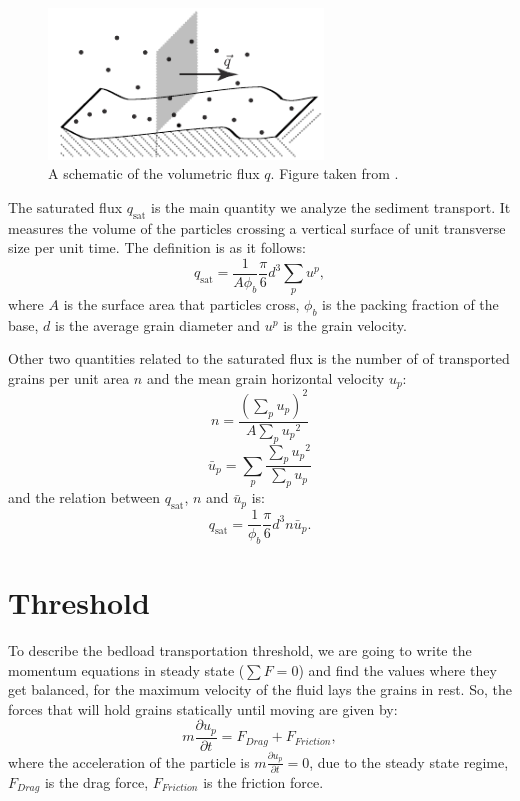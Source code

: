 \begin{figure}[H]
    \centering
    \includegraphics[width=0.65\textwidth]{04-figuras/flux_density.pdf}
    \caption[Transport volumetric flux.]{A schematic of the volumetric flux $q$. Figure taken from \cite{Granular_Media_Between_Fluid_and_Solid}.}
    \label{fig:flux_density}
\end{figure}

    The saturated flux $q_\textrm{sat}$ is the main quantity we analyze the sediment transport. It measures the volume of the particles crossing a vertical surface of unit transverse size per unit time. The definition is as it follows:
\begin{equation}
    q_\textrm{sat} = \frac{1}{A \phi_b} \frac{\pi}{6}d^3 \sum_p u^p,
    \label{equ:qsat}
\end{equation}
where $A$ is the surface area that particles cross, $\phi_b$ is the packing fraction of the base, $d$ is the average grain diameter and $u^p$ is the grain velocity.

    Other two quantities related to the saturated flux is the number of of transported grains per unit area $n$ and the mean grain horizontal velocity $u_p$:
\begin{equation}
    n = \frac{\left(\sum_p u_p\right)^2}{A\sum_p {u_p}^2}
    \label{equ:n}
\end{equation}
\begin{equation}
    \bar{u}_p = \sum_p \frac{\sum_p {u_p}^2}{\sum_p {u_p}}
    \label{equ:up}
\end{equation}
and the relation between $q_\textrm{sat}$, $n$ and $\bar{u}_p$ is:
\begin{equation}
    q_\textrm{sat} = \frac{1}{\phi_b} \frac{\pi}{6} d^3 n \bar{u}_p.
\end{equation}

\section{Threshold}
    To describe the bedload transportation threshold, we are going to write the momentum equations in steady state ($\sum F = 0$) and find the values where they get balanced, for the maximum velocity of the fluid lays the grains in rest. So, the forces that will hold grains statically until moving are given by:
\begin{equation}
    m\frac{\partial u_p}{\partial t} = F_{Drag} + F_{Friction},
\end{equation}
where the acceleration of the particle is $m\frac{\partial u_p}{\partial t} = 0$, due to the steady state regime, $F_{Drag}$ is the drag force, $F_{Friction}$ is the friction force.

